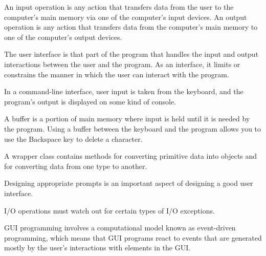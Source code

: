 \label{summaryof-important-points}

\begin{SMBL}

\vspace*{6pt}
\item An input operation is any action that transfers data from the
user to the computer's main memory via one of the computer's input
devices. An output operation is any action that transfers data
from the computer's main memory to one of the computer's output
devices. 

\vspace*{6pt}
\item The user interface is that part of the program that handles the
input and output interactions between the user and the program.  As an
interface, it limits or constrains the manner in which the user can
interact with the program.

\vspace*{6pt}
\item In a command-line interface, user input is taken from the
keyboard, and the program's output is displayed on some kind of
console. 

\vspace*{6pt}
\item A buffer is a portion of main memory where input is held until
it is needed by the program. Using a buffer between the keyboard and
the program allows you to use the Backspace key to delete a
character. 

\vspace*{6pt}
\item A wrapper class contains methods for converting primitive
data into objects and for converting data from one type to another.

\vspace*{6pt}
\item Designing appropriate prompts is an important aspect of
designing a good user interface.

\vspace*{6pt}
\item I/O operations must watch out for certain types of I/O
exceptions.

\vspace*{6pt}
\item GUI programming involves a computational model known as 
event-driven programming, which means that GUI programs react to
events that are generated mostly by the user's interactions with
elements in the GUI.


\end{SMBL}
